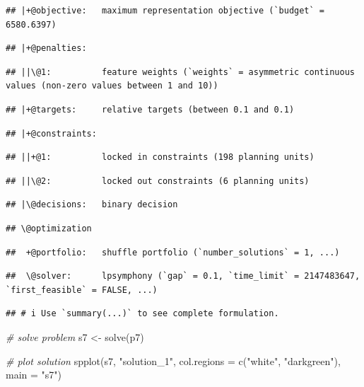 \documentclass[
  12pt,
]{book}
\newenvironment{Shaded}{\begin{snugshade}}{\end{snugshade}}
\newcommand{\AttributeTok}[1]{\textcolor[rgb]{0.77,0.63,0.00}{#1}}
\newcommand{\CommentTok}[1]{\textcolor[rgb]{0.56,0.35,0.01}{\textit{#1}}}
\newcommand{\FunctionTok}[1]{\textcolor[rgb]{0.00,0.00,0.00}{#1}}
\newcommand{\NormalTok}[1]{#1}
\newcommand{\OtherTok}[1]{\textcolor[rgb]{0.56,0.35,0.01}{#1}}
\newcommand{\StringTok}[1]{\textcolor[rgb]{0.31,0.60,0.02}{#1}}
\begin{document}
\begin{verbatim}
## |+@objective:   maximum representation objective (`budget` = 6580.6397)
\end{verbatim}

\begin{verbatim}
## |+@penalties:
\end{verbatim}

\begin{verbatim}
## ||\@1:          feature weights (`weights` = asymmetric continuous values (non-zero values between 1 and 10))
\end{verbatim}

\begin{verbatim}
## |+@targets:     relative targets (between 0.1 and 0.1)
\end{verbatim}

\begin{verbatim}
## |+@constraints:
\end{verbatim}

\begin{verbatim}
## ||+@1:          locked in constraints (198 planning units)
\end{verbatim}

\begin{verbatim}
## ||\@2:          locked out constraints (6 planning units)
\end{verbatim}

\begin{verbatim}
## |\@decisions:   binary decision
\end{verbatim}

\begin{verbatim}
## \@optimization
\end{verbatim}

\begin{verbatim}
##  +@portfolio:   shuffle portfolio (`number_solutions` = 1, ...)
\end{verbatim}

\begin{verbatim}
##  \@solver:      lpsymphony (`gap` = 0.1, `time_limit` = 2147483647, `first_feasible` = FALSE, ...)
\end{verbatim}

\begin{verbatim}
## # i Use `summary(...)` to see complete formulation.
\end{verbatim}

\begin{Shaded}
\begin{Highlighting}[]
\CommentTok{\# solve problem}
\NormalTok{s7 }\OtherTok{\textless{}{-}} \FunctionTok{solve}\NormalTok{(p7)}

\CommentTok{\# plot solution}
\FunctionTok{spplot}\NormalTok{(s7, }\StringTok{"solution\_1"}\NormalTok{, }\AttributeTok{col.regions =} \FunctionTok{c}\NormalTok{(}\StringTok{"white"}\NormalTok{, }\StringTok{"darkgreen"}\NormalTok{), }\AttributeTok{main =} \StringTok{"s7"}\NormalTok{)}
\end{Highlighting}
\end{Shaded}
\end{document}

